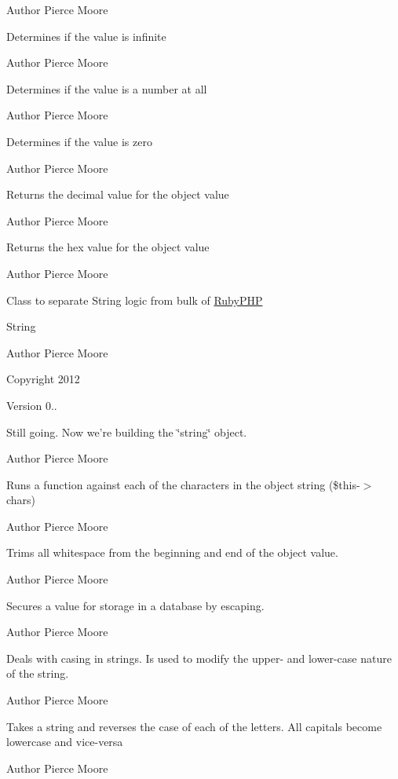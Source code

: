 \begin{DoxyAuthor}{Author}
Pierce Moore
\end{DoxyAuthor}
Determines if the value is infinite

\begin{DoxyAuthor}{Author}
Pierce Moore
\end{DoxyAuthor}
Determines if the value is a number at all

\begin{DoxyAuthor}{Author}
Pierce Moore
\end{DoxyAuthor}
Determines if the value is zero

\begin{DoxyAuthor}{Author}
Pierce Moore
\end{DoxyAuthor}
Returns the decimal value for the object value

\begin{DoxyAuthor}{Author}
Pierce Moore
\end{DoxyAuthor}
Returns the hex value for the object value

\begin{DoxyAuthor}{Author}
Pierce Moore
\end{DoxyAuthor}
Class to separate String logic from bulk of \hyperlink{namespace_ruby_p_h_p}{Ruby\-P\-H\-P}

String \begin{DoxyAuthor}{Author}
Pierce Moore 
\end{DoxyAuthor}
\begin{DoxyCopyright}{Copyright}
2012 
\end{DoxyCopyright}
\begin{DoxyVersion}{Version}
0..
\end{DoxyVersion}
Still going. Now we're building the \char`\"{}string\char`\"{} object.

\begin{DoxyAuthor}{Author}
Pierce Moore
\end{DoxyAuthor}
Runs a function against each of the characters in the object string (\$this-\/$>$chars)

\begin{DoxyAuthor}{Author}
Pierce Moore
\end{DoxyAuthor}
Trims all whitespace from the beginning and end of the object value.

\begin{DoxyAuthor}{Author}
Pierce Moore
\end{DoxyAuthor}
Secures a value for storage in a database by escaping.

\begin{DoxyAuthor}{Author}
Pierce Moore
\end{DoxyAuthor}
Deals with casing in strings. Is used to modify the upper-\/ and lower-\/case nature of the string.

\begin{DoxyAuthor}{Author}
Pierce Moore
\end{DoxyAuthor}
Takes a string and reverses the case of each of the letters. All capitals become lowercase and vice-\/versa

\begin{DoxyAuthor}{Author}
Pierce Moore 
\end{DoxyAuthor}
